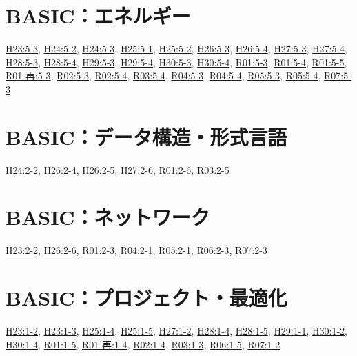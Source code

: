 \section{BASIC：エネルギー}
\hyperref[q:h23-reg-basic-5-3]{H23:5-3}, \hyperref[q:h24-reg-basic-5-2]{H24:5-2}, \hyperref[q:h24-reg-basic-5-3]{H24:5-3}, \hyperref[q:h25-reg-basic-5-1]{H25:5-1}, \hyperref[q:h25-reg-basic-5-2]{H25:5-2}, \hyperref[q:h26-reg-basic-5-3]{H26:5-3}, \hyperref[q:h26-reg-basic-5-4]{H26:5-4}, \hyperref[q:h27-reg-basic-5-3]{H27:5-3}, \hyperref[q:h27-reg-basic-5-4]{H27:5-4}, \hyperref[q:h28-reg-basic-5-3]{H28:5-3}, \hyperref[q:h28-reg-basic-5-4]{H28:5-4}, \hyperref[q:h29-reg-basic-5-3]{H29:5-3}, \hyperref[q:h29-reg-basic-5-4]{H29:5-4}, \hyperref[q:h30-reg-basic-5-3]{H30:5-3}, \hyperref[q:h30-reg-basic-5-4]{H30:5-4}, \hyperref[q:r01-reg-basic-5-3]{R01:5-3}, \hyperref[q:r01-reg-basic-5-4]{R01:5-4}, \hyperref[q:r01-reg-basic-5-5]{R01:5-5}, \hyperref[q:r01-ret-basic-5-3]{R01-再:5-3}, \hyperref[q:r02-reg-basic-5-3]{R02:5-3}, \hyperref[q:r02-reg-basic-5-4]{R02:5-4}, \hyperref[q:r03-reg-basic-5-4]{R03:5-4}, \hyperref[q:r04-reg-basic-5-3]{R04:5-3}, \hyperref[q:r04-reg-basic-5-4]{R04:5-4}, \hyperref[q:r05-reg-basic-5-3]{R05:5-3}, \hyperref[q:r05-reg-basic-5-4]{R05:5-4}, \hyperref[q:r07-reg-basic-5-3]{R07:5-3}
\section{BASIC：データ構造・形式言語}
\hyperref[q:h24-reg-basic-2-2]{H24:2-2}, \hyperref[q:h26-reg-basic-2-4]{H26:2-4}, \hyperref[q:h26-reg-basic-2-5]{H26:2-5}, \hyperref[q:h27-reg-basic-2-6]{H27:2-6}, \hyperref[q:r01-reg-basic-2-6]{R01:2-6}, \hyperref[q:r03-reg-basic-2-5]{R03:2-5}
\section{BASIC：ネットワーク}
\hyperref[q:h23-reg-basic-2-2]{H23:2-2}, \hyperref[q:h26-reg-basic-2-6]{H26:2-6}, \hyperref[q:r01-reg-basic-2-3]{R01:2-3}, \hyperref[q:r04-reg-basic-2-1]{R04:2-1}, \hyperref[q:r05-reg-basic-2-1]{R05:2-1}, \hyperref[q:r06-reg-basic-2-3]{R06:2-3}, \hyperref[q:r07-reg-basic-2-3]{R07:2-3}
\section{BASIC：プロジェクト・最適化}
\hyperref[q:h23-reg-basic-1-2]{H23:1-2}, \hyperref[q:h23-reg-basic-1-3]{H23:1-3}, \hyperref[q:h25-reg-basic-1-4]{H25:1-4}, \hyperref[q:h25-reg-basic-1-5]{H25:1-5}, \hyperref[q:h27-reg-basic-1-2]{H27:1-2}, \hyperref[q:h28-reg-basic-1-4]{H28:1-4}, \hyperref[q:h28-reg-basic-1-5]{H28:1-5}, \hyperref[q:h29-reg-basic-1-1]{H29:1-1}, \hyperref[q:h30-reg-basic-1-2]{H30:1-2}, \hyperref[q:h30-reg-basic-1-4]{H30:1-4}, \hyperref[q:r01-reg-basic-1-5]{R01:1-5}, \hyperref[q:r01-ret-basic-1-4]{R01-再:1-4}, \hyperref[q:r02-reg-basic-1-4]{R02:1-4}, \hyperref[q:r03-reg-basic-1-3]{R03:1-3}, \hyperref[q:r06-reg-basic-1-5]{R06:1-5}, \hyperref[q:r07-reg-basic-1-2]{R07:1-2}
